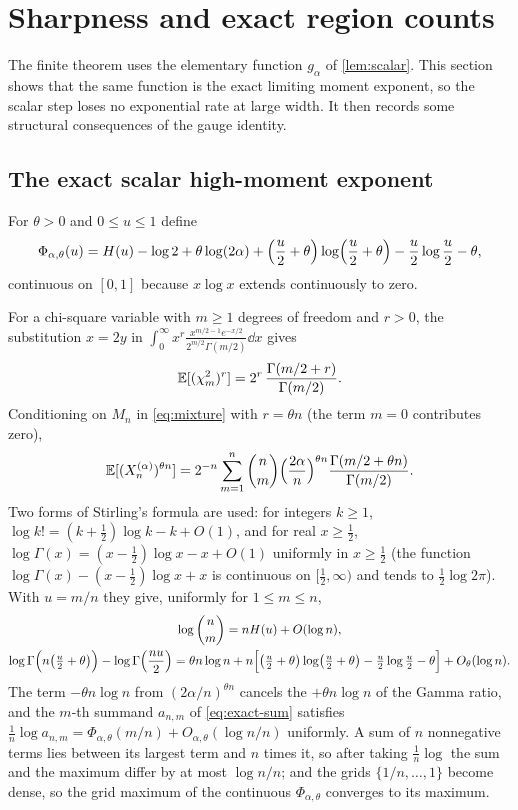 \section{Sharpness and exact region counts}
\label{sec:sharp}

The finite theorem uses the elementary function $g_\alpha$ of \cref{lem:scalar}. This section shows that the same function is the exact limiting moment exponent, so the scalar step loses no exponential rate at large width. It then records some structural consequences of the gauge identity.

\subsection{The exact scalar high-moment exponent}

For $\theta>0$ and $0\le u\le1$ define
\begin{equation}\label{eq:Phi}
\Phi_{\alpha,\theta}(u)=H(u)-\log2+\theta\log(2\alpha)+\Bigl(\frac u2+\theta\Bigr)\log\Bigl(\frac u2+\theta\Bigr)-\frac u2\log\frac u2-\theta,
\end{equation}
continuous on $[0,1]$ because $x\log x$ extends continuously to zero.

For a chi-square variable with $m\ge1$ degrees of freedom and $r>0$, the substitution $x=2y$ in $\int_0^\infty x^r\frac{x^{m/2-1}e^{-x/2}}{2^{m/2}\Gamma(m/2)}\dd x$ gives
\begin{equation}\label{eq:chi-moment}
\mathbb{E}[(\chi^2_m)^r]=2^r\,\frac{\Gamma(m/2+r)}{\Gamma(m/2)} .
\end{equation}
Conditioning on $M_n$ in \cref{eq:mixture} with $r=\theta n$ (the term $m=0$ contributes zero),
\begin{equation}\label{eq:exact-sum}
\mathbb{E}[(X_n^{(\alpha)})^{\theta n}]=2^{-n}\sum_{m=1}^n\binom nm\Bigl(\frac{2\alpha}n\Bigr)^{\theta n}\frac{\Gamma(m/2+\theta n)}{\Gamma(m/2)} .
\end{equation}
Two forms of Stirling's formula are used: for integers $k\ge1$, $\log k!=(k+\tfrac12)\log k-k+O(1)$, and for real $x\ge\tfrac12$, $\log\Gamma(x)=(x-\tfrac12)\log x-x+O(1)$ uniformly in $x\ge\tfrac12$ (the function $\log\Gamma(x)-(x-\tfrac12)\log x+x$ is continuous on $[\tfrac12,\infty)$ and tends to $\tfrac12\log2\pi$). With $u=m/n$ they give, uniformly for $1\le m\le n$,
\begin{gather*}
\log\binom nm=nH(u)+O(\log n),\\
\log\Gamma\Bigl(n\bigl(\tfrac u2+\theta\bigr)\Bigr)-\log\Gamma\Bigl(\frac{nu}2\Bigr)=\theta n\log n+n\Bigl[\bigl(\tfrac u2+\theta\bigr)\log\bigl(\tfrac u2+\theta\bigr)-\tfrac u2\log\tfrac u2-\theta\Bigr]+O_\theta(\log n).
\end{gather*}
The term $-\theta n\log n$ from $(2\alpha/n)^{\theta n}$ cancels the $+\theta n\log n$ of the Gamma ratio, and the $m$-th summand $a_{n,m}$ of \cref{eq:exact-sum} satisfies $\frac1n\log a_{n,m}=\Phi_{\alpha,\theta}(m/n)+O_{\alpha,\theta}(\log n/n)$ uniformly. A sum of $n$ nonnegative terms lies between its largest term and $n$ times it, so after taking $\frac1n\log$ the sum and the maximum differ by at most $\log n/n$; and the grids $\{1/n,\dots,1\}$ become dense, so the grid maximum of the continuous $\Phi_{\alpha,\theta}$ converges to its maximum.

